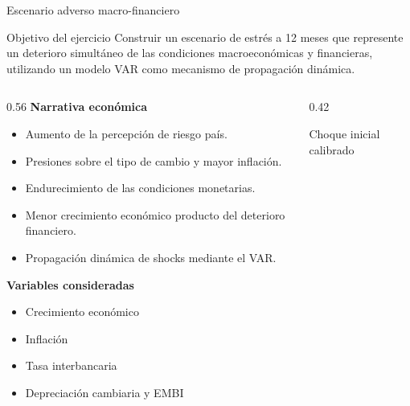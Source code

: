 \documentclass[10pt,aspectratio=169]{beamer}
\begin{document}
\begin{frame}{Escenario adverso macro-financiero}
\footnotesize
\begin{block}{Objetivo del ejercicio}
Construir un escenario de estrés a 12 meses que represente un deterioro simultáneo de las condiciones macroeconómicas y financieras, utilizando un modelo VAR como mecanismo de propagación dinámica.
\end{block}


\begin{columns}[T]

\begin{column}{0.56\textwidth}
\footnotesize
\textbf{Narrativa económica}

\small

\begin{itemize}
  \footnotesize
    \item Aumento de la percepción de riesgo país.
    
    \item Presiones sobre el tipo de cambio y mayor inflación.
    
    \item Endurecimiento de las condiciones monetarias.
    
    \item Menor crecimiento económico producto del deterioro financiero.
    
    \item Propagación dinámica de shocks mediante el VAR.
\end{itemize}

\textbf{Variables consideradas}

\begin{itemize}
  \footnotesize
    \item Crecimiento económico
    \item Inflación
    \item Tasa interbancaria
    \item Depreciación cambiaria y EMBI
\end{itemize}

\end{column}

\begin{column}{0.42\textwidth}
\footnotesize
\begin{block}{Choque inicial calibrado}
\small


\end{block}
\end{column}
\end{columns}
\end{frame}
\end{document}
